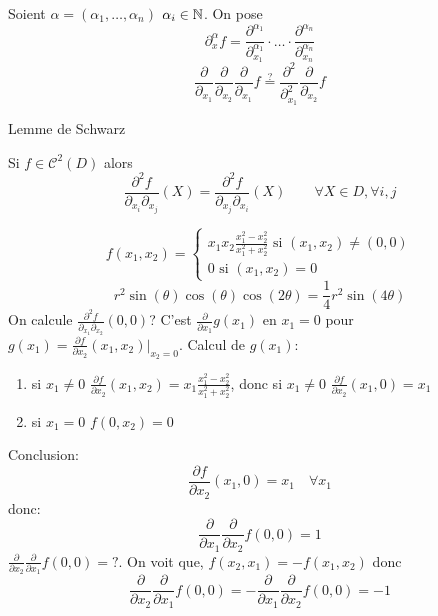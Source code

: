 \begin{definition}
    Soient $\alpha = (\alpha_1, \ldots, \alpha_n)$ \quad $\alpha_i \in \mathbb{N}$. On pose
    \[
        \partial_{x}^{\alpha}f = \frac{\partial^{\alpha_1}}{\partial_{x_1}^{\alpha_1}} \cdot \ldots \cdot \frac{\partial^{\alpha_n}}{\partial_{x_n}^{\alpha_n}}
    \] 
    \[
        \frac{\partial}{\partial_{x_1}}\frac{\partial}{\partial_{x_2}}\frac{\partial}{\partial_{x_1}} f \overset{?}{=}  \frac{\partial^2}{\partial_{x_1}^2}\frac{\partial}{\partial_{x_2}}f
    \] 
\end{definition}

\begin{theorem}
    Lemme de Schwarz
    \par
    Si $f \in \mathcal{C}^2(D)$ alors 
    \[
        \displaystyle \frac{\partial^2 f}{\partial_{x_i}\partial_{x_j}}(X) = \frac{\partial^2 f}{\partial_{x_j}\partial_{x_i}}(X) \qquad \forall X \in D, \forall i, j
    \] 
\end{theorem}
\begin{eg}
   \[
   f(x_1, x_2) = \begin{cases}
       x_1x_2 \frac{x_1^2 - x_2^2}{x_1^2 + x_2^2} \text{ si } (x_1, x_2) \neq (0, 0)\\
       0 \text{ si } (x_1, x_2) = 0
   \end{cases}
   \]  
   \[
   r^2 \sin(\theta)\cos(\theta)\cos(2\theta) = \frac{1}{4}r^2\sin(4\theta)
   \] 
   On calcule $\displaystyle \frac{\partial^2f}{\partial_{x_1}\partial_{x_2}}(0, 0)$?
       C'est $\displaystyle \frac{\partial}{\partial x_1}g(x_1)$ en $x_1 = 0$ pour $\displaystyle g(x_1) = \frac{\partial f}{\partial x_2}(x_1, x_2)|_{x_2 = 0}$. Calcul de $g(x_1)$:
    \begin{enumerate}
        \item si $x_1 \neq 0$ $\frac{\partial f}{\partial x_2}(x_1, x_2) = x_1 \frac{x_1 ^ 2 - x_2^2}{x_1^2 + x_2^2}$, donc si $x_1 \neq 0$ $\frac{\partial f}{\partial x_2}(x_1, 0) = x_1$ 
        \item si $x_1 = 0$ $f(0, x_2) = 0$
    \end{enumerate}
    Conclusion:
    \[
    \frac{\partial f}{\partial x_2}(x_1, 0) = x_1 \quad \forall x_1
    \] 
    donc: 
    \[
    \frac{\partial}{\partial x_1}\frac{\partial}{\partial x_2}f(0, 0) = 1
    \] 
    $\displaystyle \frac{\partial}{\partial x_2}\frac{\partial}{\partial x_1}f(0, 0) = ?$. On voit que, $f(x_2, x_1) = -f(x_1, x_2)$ donc 
    \[
    \frac{\partial}{\partial x_2}\frac{\partial}{\partial x_1}f(0, 0) = - \frac{\partial}{\partial x_1}\frac{\partial}{\partial x_2}f(0, 0) = -1
    \] 
\end{eg}

